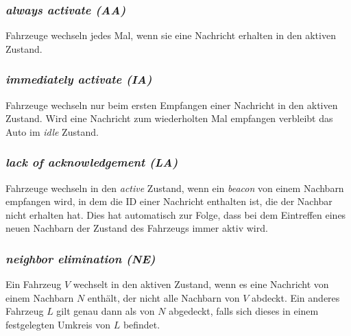 \documentclass[english,runningheads,a4paper]{llncs}[2018/03/10]
\begin{document}
\subsubsection{\textit{always activate (AA)}}
Fahrzeuge wechseln jedes Mal, wenn sie eine Nachricht erhalten in den aktiven Zustand.
\subsubsection{\textit{immediately activate (IA)}}
Fahrzeuge wechseln nur beim ersten Empfangen einer Nachricht in den aktiven Zustand.
Wird eine Nachricht zum wiederholten Mal empfangen verbleibt das Auto im \textit{idle} Zustand.
\subsubsection{\textit{lack of acknowledgement (LA)}}
Fahrzeuge wechseln in den \textit{active} Zustand, wenn ein \textit{beacon} von einem Nachbarn empfangen wird, in dem die ID einer Nachricht enthalten ist, die der Nachbar nicht erhalten hat.
Dies hat automatisch zur Folge, dass bei dem Eintreffen eines neuen Nachbarn der Zustand des Fahrzeugs immer aktiv wird.
\subsubsection{\textit{neighbor elimination (NE)}}
Ein Fahrzeug $V$ wechselt in den aktiven Zustand, wenn es eine Nachricht von einem Nachbarn $N$ enthält, der nicht alle Nachbarn von $V$ abdeckt.
Ein anderes Fahrzeug $L$ gilt genau dann als von $N$ abgedeckt, falls sich dieses in einem festgelegten Umkreis von $L$ befindet\cite{conti2013mobile}.
\end{document}
